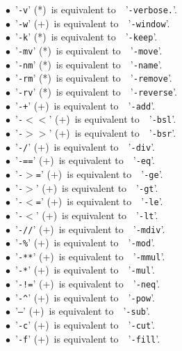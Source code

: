 \documentclass[a4paper,11pt,twoside]{book}
\begin{document}
$\bullet$~'\texttt{-v}' (*)~is equivalent to~~'\texttt{-verbose.}'.\\
$\bullet$~'\texttt{-w}' (+)~is equivalent to~~'\texttt{-window}'.\\
$\bullet$~'\texttt{-k}' (*)~is equivalent to~~'\texttt{-keep}'.\\
$\bullet$~'\texttt{-mv}' (*)~is equivalent to~~'\texttt{-move}'.\\
$\bullet$~'\texttt{-nm}' (*)~is equivalent to~~'\texttt{-name}'.\\
$\bullet$~'\texttt{-rm}' (*)~is equivalent to~~'\texttt{-remove}'.\\
$\bullet$~'\texttt{-rv}' (*)~is equivalent to~~'\texttt{-reverse}'.\\
$\bullet$~'\texttt{-+}' (+)~is equivalent to~~'\texttt{-add}'.\\
$\bullet$~'\texttt{-$<$$<$}' (+)~is equivalent to~~'\texttt{-bsl}'.\\
$\bullet$~'\texttt{-$>$$>$}' (+)~is equivalent to~~'\texttt{-bsr}'.\\
$\bullet$~'\texttt{-/}' (+)~is equivalent to~~'\texttt{-div}'.\\
$\bullet$~'\texttt{-==}' (+)~is equivalent to~~'\texttt{-eq}'.\\
$\bullet$~'\texttt{-$>$=}' (+)~is equivalent to~~'\texttt{-ge}'.\\
$\bullet$~'\texttt{-$>$}' (+)~is equivalent to~~'\texttt{-gt}'.\\
$\bullet$~'\texttt{-$<$=}' (+)~is equivalent to~~'\texttt{-le}'.\\
$\bullet$~'\texttt{-$<$}' (+)~is equivalent to~~'\texttt{-lt}'.\\
$\bullet$~'\texttt{-//}' (+)~is equivalent to~~'\texttt{-mdiv}'.\\
$\bullet$~'\texttt{-\%}' (+)~is equivalent to~~'\texttt{-mod}'.\\
$\bullet$~'\texttt{-**}' (+)~is equivalent to~~'\texttt{-mmul}'.\\
$\bullet$~'\texttt{-*}' (+)~is equivalent to~~'\texttt{-mul}'.\\
$\bullet$~'\texttt{-!=}' (+)~is equivalent to~~'\texttt{-neq}'.\\
$\bullet$~'\texttt{-\textasciicircum }' (+)~is equivalent to~~'\texttt{-pow}'.\\
$\bullet$~'\texttt{--}' (+)~is equivalent to~~'\texttt{-sub}'.\\
$\bullet$~'\texttt{-c}' (+)~is equivalent to~~'\texttt{-cut}'.\\
$\bullet$~'\texttt{-f}' (+)~is equivalent to~~'\texttt{-fill}'.\\
\end{document}
